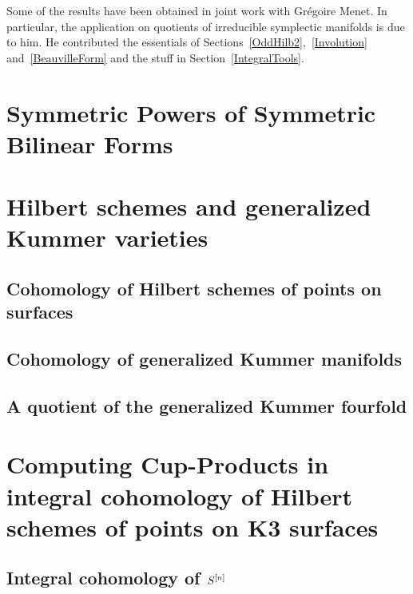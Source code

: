 \documentclass[11pt,twoside]{article}
\begin{document}
Some of the results have been obtained in joint work with Gr\'egoire Menet. In particular, the application on quotients of irreducible symplectic manifolds is due to him.
He contributed the essentials of Sections~\ref{OddHilb2},~\ref{Involution} and~\ref{BeauvilleForm} and the stuff in Section~\ref{IntegralTools}.


\cleardoublepage

\tableofcontents

\cleardoublepage


\pagestyle{fancy}




\newpage
\part{Symmetric Powers of Symmetric Bilinear Forms}

\newpage
\part{Hilbert schemes and generalized Kummer varieties}
\chapter{Cohomology of Hilbert schemes of points on surfaces}






\label{integralcohomology}
\chapter{Cohomology of generalized Kummer manifolds}




\chapter{A quotient of the generalized Kummer fourfold}

\newpage
\part{Computing Cup-Products in integral cohomology of Hilbert schemes of points on K3 surfaces}
\chapter{Integral cohomology of \texorpdfstring{$S^{[n]}$}{S[n]}}



\appendix

\clearpage

\clearpage

\newpage

\end{document}
